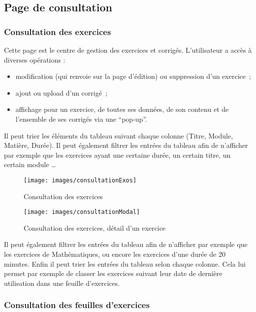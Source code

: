 \subsection{Page de consultation}
\subsubsection{Consultation des exercices}

Cette page est le centre de gestion des exercices et corrigés. L'utilisateur a accès à diverses opérations :
\smallskip 

\begin{itemize}
\item modification (qui renvoie sur la page d'édition) ou suppression d'un exercice~;
\item ajout ou upload d'un corrigé~; 
\item affichage pour un exercice, de toutes ses données, de son contenu et de l'ensemble de ses corrigés via une \enquote{pop-up}. 
\end{itemize}
\medskip

Il peut trier les éléments du tableau suivant chaque colonne (Titre, Module, Matière, Durée). Il peut également filtrer les entrées du tableau afin de n'afficher par exemple que les exercices ayant une certaine durée, un certain titre, un certain module \ldots
\newpage
\begin{figure}[!hH]
\begin{center}
\texttt{[image: images/consultationExos]}
\caption{Consultation des exercices}
\end{center}
\end{figure}

\begin{figure}[!hH]
\begin{center}
\texttt{[image: images/consultationModal]}
\caption{Consultation des exercices, détail d'un exercice}
\end{center}
\end{figure}


Il peut également filtrer les entrées du tableau afin de n'afficher par exemple que les exercices de Mathématiques, ou encore les exercices d'une durée de 20 minutes. Enfin il peut trier les entrées du tableau selon chaque colonne. Cela lui permet par exemple de classer les exercices suivant leur date de dernière utilisation dans une feuille d'exercices.

\subsubsection{Consultation des feuilles d'exercices}

